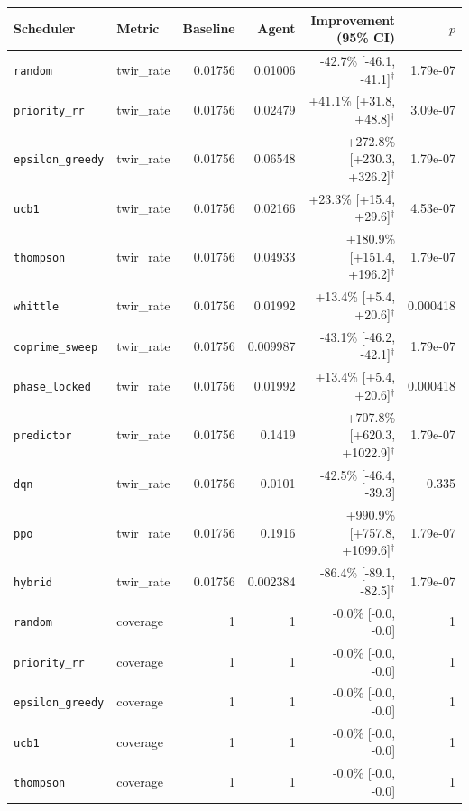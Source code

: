 \begin{table}[t]
  \centering
  \small
  \begin{tabular}{llrrrr}
    \toprule
    Scheduler & Metric & Baseline & Agent & Improvement (95\% CI) & $p$ \\
    \midrule
    \midrule
    \texttt{random} & twir\_rate & 0.01756 & 0.01006 & -42.7\% [-46.1, -41.1]$^{\dagger}$ & 1.79e-07 \\
    \texttt{priority\_rr} & twir\_rate & 0.01756 & 0.02479 & +41.1\% [+31.8, +48.8]$^{\dagger}$ & 3.09e-07 \\
    \texttt{epsilon\_greedy} & twir\_rate & 0.01756 & 0.06548 & +272.8\% [+230.3, +326.2]$^{\dagger}$ & 1.79e-07 \\
    \texttt{ucb1} & twir\_rate & 0.01756 & 0.02166 & +23.3\% [+15.4, +29.6]$^{\dagger}$ & 4.53e-07 \\
    \texttt{thompson} & twir\_rate & 0.01756 & 0.04933 & +180.9\% [+151.4, +196.2]$^{\dagger}$ & 1.79e-07 \\
    \texttt{whittle} & twir\_rate & 0.01756 & 0.01992 & +13.4\% [+5.4, +20.6]$^{\dagger}$ & 0.000418 \\
    \texttt{coprime\_sweep} & twir\_rate & 0.01756 & 0.009987 & -43.1\% [-46.2, -42.1]$^{\dagger}$ & 1.79e-07 \\
    \texttt{phase\_locked} & twir\_rate & 0.01756 & 0.01992 & +13.4\% [+5.4, +20.6]$^{\dagger}$ & 0.000418 \\
    \texttt{predictor} & twir\_rate & 0.01756 & 0.1419 & +707.8\% [+620.3, +1022.9]$^{\dagger}$ & 1.79e-07 \\
    \texttt{dqn} & twir\_rate & 0.01756 & 0.0101 & -42.5\% [-46.4, -39.3] & 0.335 \\
    \texttt{ppo} & twir\_rate & 0.01756 & 0.1916 & +990.9\% [+757.8, +1099.6]$^{\dagger}$ & 1.79e-07 \\
    \texttt{hybrid} & twir\_rate & 0.01756 & 0.002384 & -86.4\% [-89.1, -82.5]$^{\dagger}$ & 1.79e-07 \\
    \midrule
    \texttt{random} & coverage & 1 & 1 & -0.0\% [-0.0, -0.0] & 1 \\
    \texttt{priority\_rr} & coverage & 1 & 1 & -0.0\% [-0.0, -0.0] & 1 \\
    \texttt{epsilon\_greedy} & coverage & 1 & 1 & -0.0\% [-0.0, -0.0] & 1 \\
    \texttt{ucb1} & coverage & 1 & 1 & -0.0\% [-0.0, -0.0] & 1 \\
    \texttt{thompson} & coverage & 1 & 1 & -0.0\% [-0.0, -0.0] & 1 \\

\end{tabular}
\end{table}
